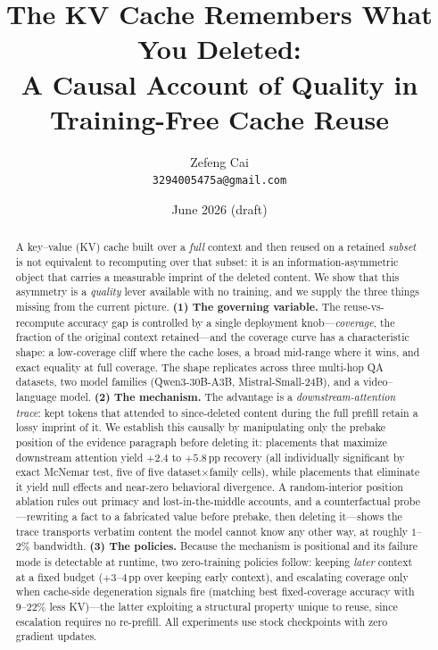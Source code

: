 \documentclass[11pt]{article}
\title{\textbf{The KV Cache Remembers What You Deleted:\\
A Causal Account of Quality in Training-Free Cache Reuse}}
\author{%
Zefeng Cai\\
\texttt{3294005475a@gmail.com}%
}
\date{June 2026 \quad (draft)}
\newcommand{\pp}{\,\mathrm{pp}}
\begin{document}
\maketitle

\begin{abstract}
A key--value (KV) cache built over a \emph{full} context and then reused on a retained \emph{subset} is not equivalent to recomputing over that subset: it is an information-asymmetric object that carries a measurable imprint of the deleted content. We show that this asymmetry is a \emph{quality} lever available with no training, and we supply the three things missing from the current picture. \textbf{(1) The governing variable.} The reuse-vs-recompute accuracy gap is controlled by a single deployment knob---\emph{coverage}, the fraction of the original context retained---and the coverage curve has a characteristic shape: a low-coverage cliff where the cache loses, a broad mid-range where it wins, and exact equality at full coverage. The shape replicates across three multi-hop QA datasets, two model families (Qwen3-30B-A3B, Mistral-Small-24B), and a video--language model. \textbf{(2) The mechanism.} The advantage is a \emph{downstream-attention trace}: kept tokens that attended to since-deleted content during the full prefill retain a lossy imprint of it. We establish this causally by manipulating only the prebake position of the evidence paragraph before deleting it: placements that maximize downstream attention yield $+2.4$ to $+5.8\pp$ recovery (all individually significant by exact McNemar test, five of five dataset$\times$family cells), while placements that eliminate it yield null effects and near-zero behavioral divergence. A random-interior position ablation rules out primacy and lost-in-the-middle accounts, and a counterfactual probe---rewriting a fact to a fabricated value before prebake, then deleting it---shows the trace transports verbatim content the model cannot know any other way, at roughly $1$--$2\%$ bandwidth. \textbf{(3) The policies.} Because the mechanism is positional and its failure mode is detectable at runtime, two zero-training policies follow: keeping \emph{later} context at a fixed budget ($+3$--$4\pp$ over keeping early context), and escalating coverage only when cache-side degeneration signals fire (matching best fixed-coverage accuracy with $9$--$22\%$ less KV)---the latter exploiting a structural property unique to reuse, since escalation requires no re-prefill. All experiments use stock checkpoints with zero gradient updates.
\end{abstract}
\end{document}
